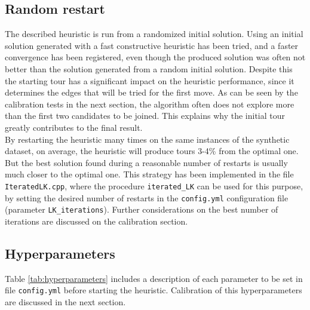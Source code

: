 \subsection{Random restart}
The described heuristic is run from a randomized initial solution. Using an initial solution generated with a fast constructive heuristic has been tried, and a faster convergence has been registered, even though the produced solution was often not better than the solution generated from a random initial solution.
Despite this the starting tour has a significant impact on the heuristic performance, since it determines the edges that will be tried for the first move. As can be seen by the calibration tests in the next section, the algorithm often does not explore more than the first two candidates to be joined. This explains why the initial tour greatly contributes to the final result.\\
By restarting the heuristic many times on the same instances of the synthetic dataset, on average, the heuristic will produce tours 3-4\% from the optimal one. But the best solution found during a reasonable number of restarts is usually much closer to the optimal one. This strategy has been implemented in the file \texttt{IteratedLK.cpp}, where the procedure \texttt{iterated\_LK} can be used for this purpose, by setting the desired number of restarts in the \texttt{config.yml} configuration file (parameter \texttt{LK\_iterations}). Further considerations on the best number of iterations are discussed on the calibration section.

\subsection{Hyperparameters}
Table \ref{tab:hyperparameters} includes a description of each parameter to be set in file \texttt{config.yml} before starting the heuristic. Calibration of this hyperparameters are discussed in the next section.


